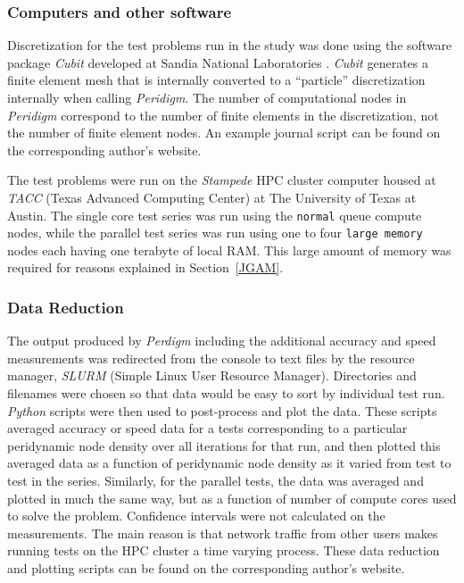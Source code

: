 \documentclass[preprint,12pt]{elsarticle}
\begin{document}
\subsubsection{Computers and other software} 
%
Discretization for the test problems run in the study was done using the software package \emph{Cubit} developed at Sandia National Laboratories \cite{ref-Cubit}. \emph{Cubit} generates a finite element mesh that is internally converted to a ``particle'' discretization internally when calling \emph{Peridigm}. The number of computational nodes in \emph{Peridigm} correspond to the number of finite elements in the discretization, not the number of finite element nodes.  An example journal script can be found on the corresponding author's website. 

The test problems were run on the \emph{Stampede} HPC cluster computer housed at \emph{TACC} (Texas Advanced Computing Center) at The University of Texas at Austin. The single core test series was run using the {\tt normal} queue compute nodes, while the parallel test series was run using one to four {\tt large memory} nodes each having one terabyte of local RAM. This large amount of memory was required for reasons explained in Section~\ref{JGAM}.  

\subsubsection{Data Reduction} 
The output produced by \emph{Perdigm} including the additional accuracy and speed measurements was redirected from the console to text files by the resource manager, \emph{SLURM} (Simple Linux User Resource Manager).  Directories and filenames were chosen so that data would be easy to sort by individual test run.  \emph{Python} scripts were then used to post-process and plot the data. These scripts averaged accuracy or speed data for a tests corresponding to a particular peridynamic node density over all iterations for that run, and then plotted this averaged data  as a function of peridynamic node density as it varied from test to test in the series.  Similarly, for the parallel tests, the data was averaged and plotted in much the same way, but as a function of number of compute cores used to solve the problem. Confidence intervals were not calculated on the measurements. The main reason is that network traffic from other users makes running tests on the HPC cluster a time varying process. These data reduction and plotting scripts can be found on the corresponding author's website.
\end{document}
